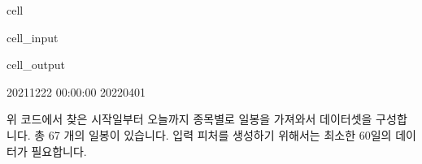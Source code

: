 \documentclass[letterpaper,10pt,english]{jupyterBook}
\begin{document}
\begin{sphinxuseclass}{cell}\begin{sphinxVerbatimInput}

\begin{sphinxuseclass}{cell_input}
\begin{sphinxVerbatim}[commandchars=\\\{\}]
 
  
   
     
 
\end{sphinxVerbatim}

\end{sphinxuseclass}\end{sphinxVerbatimInput}
\begin{sphinxVerbatimOutput}

\begin{sphinxuseclass}{cell_output}
\begin{sphinxVerbatim}[commandchars=\\\{\}]
2021\PYGZhy{}12\PYGZhy{}22 00:00:00 2022\PYGZhy{}04\PYGZhy{}01
\end{sphinxVerbatim}

\end{sphinxuseclass}\end{sphinxVerbatimOutput}

\end{sphinxuseclass}
\sphinxAtStartPar
 위 코드에서 찾은 시작일부터 오늘까지 종목별로 일봉을 가져와서 데이터셋을 구성합니다. 총 67 개의 일봉이 있습니다. 입력 피처를 생성하기 위해서는 최소한 60일의 데이터가 필요합니다.
\end{document}

